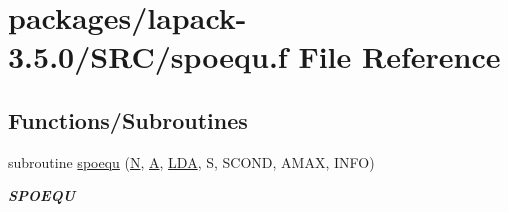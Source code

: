 \hypertarget{spoequ_8f}{}\section{packages/lapack-\/3.5.0/\+S\+R\+C/spoequ.f File Reference}
\label{spoequ_8f}
\subsection*{Functions/\+Subroutines}
\begin{DoxyCompactItemize}
\item 
subroutine \hyperlink{group__realPOcomputational_gaea93f7525cdea32854b20ed0bddfc885}{spoequ} (\hyperlink{polmisc_8c_a0240ac851181b84ac374872dc5434ee4}{N}, \hyperlink{classA}{A}, \hyperlink{example__user_8c_ae946da542ce0db94dced19b2ecefd1aa}{L\+D\+A}, S, S\+C\+O\+N\+D, A\+M\+A\+X, I\+N\+F\+O)
\begin{DoxyCompactList}\small\item\em {\bfseries S\+P\+O\+E\+Q\+U} \end{DoxyCompactList}\end{DoxyCompactItemize}

